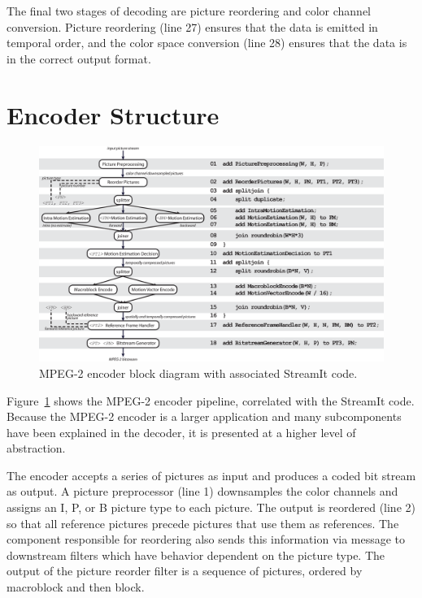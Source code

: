 The final two stages of decoding are picture reordering and color 
channel conversion. Picture reordering (line 27) ensures that the data 
is emitted in temporal order, and the color space conversion (line 28) 
ensures that the data is in the correct output format. 

\section{Encoder Structure}

\begin{figure}[h]
  \begin{center}
    \includegraphics[scale=0.4, angle=0]{./encoder_with_code.eps}
    \caption{MPEG-2 encoder block diagram with associated StreamIt code.}
    \label{fig:encoder-with-code}
  \end{center}
\end{figure}

Figure~\ref{fig:encoder-with-code} shows the MPEG-2 encoder 
pipeline, correlated with the StreamIt code. Because the MPEG-2 
encoder is a larger application and many subcomponents have been 
explained in the decoder, it is presented at a higher level of abstraction. 

The encoder accepts a series of pictures as input and produces a coded 
bit stream as output. A picture preprocessor (line 1) downsamples the color 
channels and assigns an I, P, or B picture type to each 
picture. The output is reordered (line 2) so that all reference 
pictures precede pictures that use them as references. The component 
responsible for reordering also sends this information via message to 
downstream filters which have behavior dependent on the picture 
type. The output of the picture reorder filter is a sequence of 
pictures, ordered by macroblock and then block.

